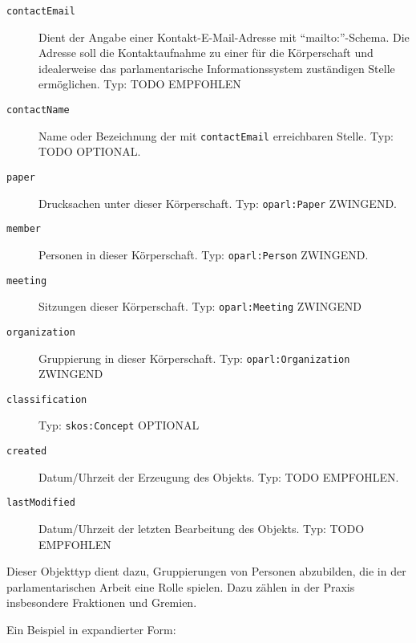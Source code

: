 \documentclass[,a4paper]{article}
\begin{document}
\begin{description}
\item[\texttt{contactEmail}]
Dient der Angabe einer Kontakt-E-Mail-Adresse mit ``mailto:''-Schema.
Die Adresse soll die Kontaktaufnahme zu einer für die Körperschaft und
idealerweise das parlamentarische Informationssystem zuständigen Stelle
ermöglichen. Typ: TODO EMPFOHLEN
\item[\texttt{contactName}]
Name oder Bezeichnung der mit \texttt{contactEmail} erreichbaren Stelle.
Typ: TODO OPTIONAL.
\item[\texttt{paper}]
Drucksachen unter dieser Körperschaft. Typ: \texttt{oparl:Paper}
ZWINGEND.
\item[\texttt{member}]
Personen in dieser Körperschaft. Typ: \texttt{oparl:Person} ZWINGEND.
\item[\texttt{meeting}]
Sitzungen dieser Körperschaft. Typ: \texttt{oparl:Meeting} ZWINGEND
\item[\texttt{organization}]
Gruppierung in dieser Körperschaft. Typ: \texttt{oparl:Organization}
ZWINGEND
\item[\texttt{classification}]
Typ: \texttt{skos:Concept} OPTIONAL
\item[\texttt{created}]
Datum/Uhrzeit der Erzeugung des Objekts. Typ: TODO EMPFOHLEN.
\item[\texttt{lastModified}]
Datum/Uhrzeit der letzten Bearbeitung des Objekts. Typ: TODO EMPFOHLEN
\end{description}


Dieser Objekttyp dient dazu, Gruppierungen von Personen abzubilden, die
in der parlamentarischen Arbeit eine Rolle spielen. Dazu zählen in der
Praxis insbesondere Fraktionen und Gremien.

Ein Beispiel in expandierter Form:
\end{document}
